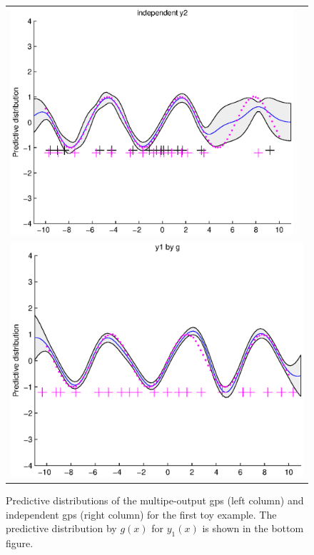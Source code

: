 \documentclass{article} %
\begin{document}
\begin{figure}
\begin{tabular}{cc}
\includegraphics[scale=0.5]{figures/ssvi-svi2.eps} \\
\multicolumn{2}{c}{\includegraphics[scale=0.5]{figures/ssvi-y1byg.eps} }
\end{tabular}
\label{fig4}
\caption{Predictive distributions of the multipe-output gps (left column) and independent gps (right column) for the first toy example. The predictive distribution by $g(x)$ for $y_1(x)$ is shown in the bottom figure.}
\end{figure}
\end{document}

